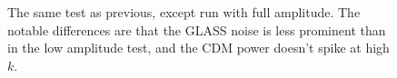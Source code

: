 \documentclass[]{article}
\begin{document}
\begin{figure}[h]
        \caption{The same test as previous, except run with full amplitude. The notable
differences are that the GLASS noise is less prominent than in the low amplitude test,
and the CDM power doesn't spike at high $k$.}
\end{figure}

\clearpage
\end{document}

